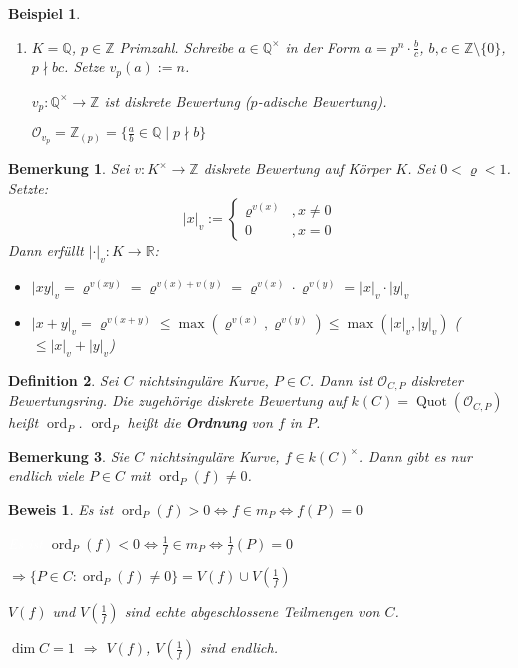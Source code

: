 \documentclass[a4paper, 12pt, numbers=noendperiod, chapterprefix=true]{scrbook}
\theoremstyle{break}
\newtheorem{Def}{Definition}[section]
\newtheorem{Bem}[Def]{Bemerkung}
\theoremstyle{nonumberbreak}
\newtheorem{nnBsp}{Beispiel}
\newtheorem{Bew}{Beweis}
\theoremstyle{nonumberplain}
\newcommand{\quot}[1]{\textrm{\glqq}{#1}\textrm{\grqq}}
\newcommand{\emp}[1]{\textbf{\emph{#1}}}
\newcommand{\defterm}[1]{{\index{#1}}\emp{#1}}
\DeclareMathOperator{\Quot}{Quot}
\DeclareMathOperator{\ord}{ord}
\newcommand{\R}{\mathbb{R}}
\newcommand{\Z}{\mathbb{Z}}
\newcommand{\Q}{\mathbb{Q}}
\newcommand{\calO}{\mathcal{O}}
\newcommand{\X}{\times}
\begin{document}
\begin{nnBsp}\begin{enumerate}[1)]\item[3)]
$K=\Q$, $p\in \Z$ Primzahl. Schreibe $a\in \Q^\times$ in der Form $a=p^n\cdot\frac{b}{c}$, $b,c\in\Z\setminus\{0\}$, $p\nmid bc$. Setze $v_p(a):=n$.

$v_p:\Q^\times\to\Z$ ist diskrete Bewertung (\quot{$p$-adische Bewertung}).

$\calO_{v_p}=\Z_{(p)}=\{\frac{a}{b}\in\Q\mid p\nmid b\}$
\end{enumerate}\end{nnBsp}

\begin{Bem}
Sei $v:K^\X\to\Z$ diskrete Bewertung auf K\"orper $K$. Sei $0<\varrho<1$. Setzte:
	\[|x|_v:=\left\{\begin{array}{lr}\varrho^{v(x)} & ,x\ne 0\\0 & ,x=0\end{array}\right.\]
Dann erf\"ullt $|\cdot|_v:K\to\R$:\begin{itemize}
\item$|xy|_v=\varrho^{v(xy)}=\varrho^{v(x)+v(y)}=\varrho^{v(x)}\cdot\varrho^{v(y)}=|x|_v\cdot|y|_v$
\item$|x+y|_v=\varrho^{v(x+y)}\le\max(\varrho^{v(x)},\varrho^{v(y)})\le\max(|x|_v,|y|_v)$ ($\le|x|_v+|y|_v$)
\end{itemize}\end{Bem}

\begin{Def}
Sei $C$ nichtsingul\"are Kurve, $P\in C$. Dann ist $\calO_{C,P}$ diskreter Bewertungsring. Die zugeh\"orige diskrete Bewertung auf $k(C)=\Quot(\calO_{C,P})$ hei\ss t $\ord_P$. $\ord_P$ hei\ss t die \defterm{Ordnung} von $f$ in $P$.
\end{Def}

\begin{Bem}\label{20.8}
Sie $C$ nichtsingul\"are Kurve, $f\in k(C)^\X$. Dann gibt es nur endlich viele $P\in C$ mit $\ord_P(f)\ne0$.
\end{Bem}

\begin{Bew}
Es ist $\ord_P(f) > 0 \Leftrightarrow f \in m_P \Leftrightarrow f(P)=0$

\textcolor{white}{Es ist} $\ord_P(f) < 0 \Leftrightarrow \frac{1}{f} \in m_P \Leftrightarrow \frac{1}{f}(P)=0$

$\Rightarrow \{P\in C: \ord_P(f)\ne0\} = V(f)\cup V(\frac{1}{f})$

$V(f)$ und $V(\frac{1}{f})$ sind echte abgeschlossene Teilmengen von $C$.

$\dim C=1$ $\Rightarrow$ $V(f)$, $V(\frac{1}{f})$ sind endlich.
\end{Bew}
\end{document}

